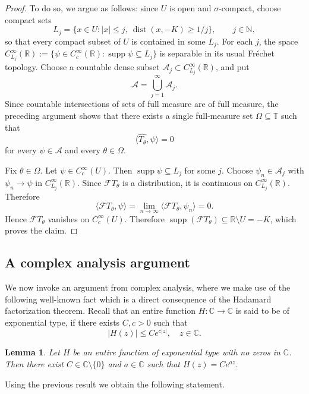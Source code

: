\documentclass[reqno,a4paper,12pt]{amsart}
\numberwithin{equation}{section}
\newtheorem{lemma}[definition]{Lemma}
\def\C{{\mathbb C}}
\newcommand{\ft}{{\mathcal{F}}}
\newcommand\1{\mathds{1}}
\begin{document}
\begin{proof}
To do so, we argue as follows:
since $U$ is open and $\sigma$-compact, choose compact sets
$$
L_j=\{x\in U: |x|\le j,\ \operatorname{dist}(x,-K)\ge 1/j\},
\qquad j\in\mathbb N,
$$
so that every compact subset of $U$ is contained in some $L_j$. For each
$j$, the space
$
C_{L_j}^\infty(\mathbb R)
:=
\{\psi\in C_c^\infty(\mathbb R):\operatorname{supp}\psi\subseteq L_j\}
$
is separable in its usual Fréchet topology. Choose a countable dense subset
$\mathcal A_j\subset C_{L_j}^\infty(\mathbb R)$, and put
$$
\mathcal A=\bigcup_{j=1}^\infty \mathcal A_j .
$$
Since countable intersections of sets of full measure are of full measure, the preceding argument shows that there exists a single
full-measure set $\Omega\subseteq\mathbb T$ such that
$$
\langle \widehat{T_\theta},\psi \rangle = 0
$$
for every $\psi\in\mathcal A$ and every $\theta\in\Omega$.

Fix $\theta\in\Omega$. Let $\psi\in C_c^\infty(U)$. Then
$\operatorname{supp}\psi\subseteq L_j$ for some $j$. Choose
$\psi_n\in\mathcal A_j$ with $\psi_n\to\psi$ in
$C_{L_j}^\infty(\mathbb R)$. Since $\ft T_\theta$ is a distribution,
it is continuous on $C_{L_j}^\infty(\mathbb R)$. Therefore
$$
\langle \ft T_\theta,\psi\rangle
=
\lim_{n\to\infty}
\langle \ft T_\theta,\psi_n\rangle
=
0.
$$
Hence $\ft T_\theta$ vanishes on $C_c^\infty(U)$. Therefore $\operatorname{supp}(\ft T_\theta) \subseteq \mathbb R\setminus U=-K$, which proves the claim.
\end{proof}

\subsection{A complex analysis argument}

We now invoke an argument from complex analysis, where we make use of the following well-known fact which is a direct consequence of the Hadamard factorization theorem. Recall that an entire function $H : \C \to \C$ is said to be of exponential type, if there exists $C,c>0$ such that
$$
|H(z)| \leq C e^{c|z|}, \quad z \in \C.
$$

\begin{lemma}\label{lem:zero-free-exp-type}
Let $H$ be an entire function of exponential type with no zeros in $\mathbb C$. Then there exist $C\in \mathbb C\setminus\{0\}$ and $a\in\mathbb C$ such that $H(z)=Ce^{az}$.
\end{lemma}

Using the previous result we obtain the following statement.
\end{document}
